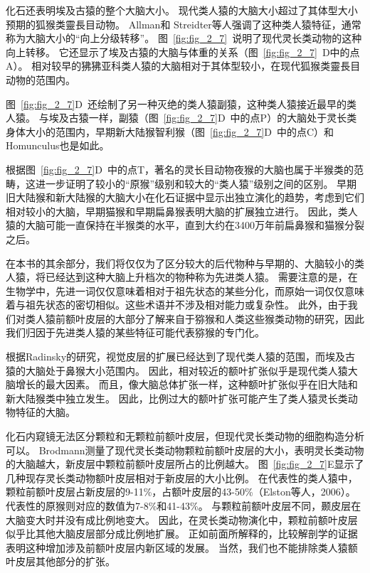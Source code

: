 化石还表明埃及古猿的整个大脑大小。
现代类人猿的大脑大小超过了其体型大小预期的狐猴类靈長目动物。 Allman\cite{allman1999evolving}和 Streidter\cite{striedter2005principles}等人强调了这种类人猿特征，通常称为大脑大小的“向上分级转移”。
图~\ref{fig:fig_2_7}~说明了现代灵长类动物的这种向上转移。
它还显示了埃及古猿的大脑与体重的关系（图~\ref{fig:fig_2_7}~D中的点A）。
相对较早的狒狒亚科类人猿的大脑相对于其体型较小，在现代狐猴类靈長目动物的范围内。


图~\ref{fig:fig_2_7}D~还绘制了另一种灭绝的类人猿副猿\cite{bush2004high}，这种类人猿接近最早的类人猿\cite{simons2004cranium}。
与埃及古猿一样，副猿（图~\ref{fig:fig_2_7}D~中的点P）的大脑处于灵长类身体大小的范围内，早期新大陆猴智利猴（图~\ref{fig:fig_2_7}D~中的点C）\cite{sears2008estimating}和Homunculus\cite{kay2006brain}也是如此。


根据图~\ref{fig:fig_2_7}D~中的点T，著名的灵长目动物夜猴的大脑也属于半猴类的范畴，这进一步证明了较小的“原猴”级别和较大的“类人猿”级别之间的区别。
早期旧大陆猴和新大陆猴的大脑大小在化石证据中显示出独立演化的趋势，考虑到它们相对较小的大脑，早期猫猴和早期扁鼻猴表明大脑的扩展独立进行。
因此，类人猿的大脑可能一直保持在半猴类的水平，直到大约在3400万年前扁鼻猴和猫猴分裂之后。


在本书的其余部分，我们将仅仅为了区分较大的后代物种与早期的、大脑较小的类人猿，将已经达到这种大脑上升档次的物种称为先进类人猿。
需要注意的是，在生物学中，先进一词仅仅意味着相对于祖先状态的某些分化，而原始一词仅仅意味着与祖先状态的密切相似。这些术语并不涉及相对能力或复杂性。
此外，由于我们对类人猿前额叶皮层的大部分了解来自于猕猴和人类这些猴类动物的研究，因此我们归因于先进类人猿的某些特征可能代表猕猴的专门化。


根据Radinsky的研究\cite{preuss2007primate}，视觉皮层的扩展已经达到了现代类人猿的范围，而埃及古猿的大脑处于鼻猴大小范围内。
因此，相对较近的额叶扩张似乎是现代类人猿大脑增长的最大因素。
而且，像大脑总体扩张一样，这种额叶扩张似乎在旧大陆和新大陆猴类中独立发生\cite{williams2010new}。
因此，比例过大的额叶扩张可能产生了类人猿灵长类动物特征的大脑。


化石内窥镜无法区分颗粒和无颗粒前额叶皮层，但现代灵长类动物的细胞构造分析可以。
Brodmann\cite{brodmann1912neue}测量了现代灵长类动物颗粒前额叶皮层的大小，表明灵长类动物的大脑越大，新皮层中颗粒前额叶皮层所占的比例越大。
图~\ref{fig:fig_2_7}E显示了几种现存灵长类动物额叶皮层相对于新皮层的大小比例。
在代表性的类人猿中，颗粒前额叶皮层占新皮层的9-11\%，占额叶皮层的43-50\%（Elston等人，2006）。
代表性的原猴则对应的数值为7-8\%和41-43\%。
与颗粒前额叶皮层不同，颞皮层在大脑变大时并没有成比例地变大\cite{rilling2002quantitative}。
因此，在灵长类动物演化中，颗粒前额叶皮层似乎比其他大脑皮层部分成比例地扩展。
正如前面所解释的，比较解剖学的证据表明这种增加涉及前额叶皮层内新区域的发展。
当然，我们也不能排除类人猿额叶皮层其他部分的扩张。


